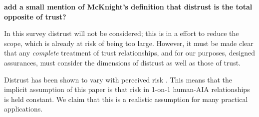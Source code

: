         \textbf{add a small mention of McKnight's definition that distrust is the total opposite of trust?}

        In this survey distrust will not be considered; this is in a effort to reduce the scope, which is already at risk of being too large. However, it must be made clear that any \emph{complete} treatment of trust relationships, and for our purposes, designed assurances, must consider the dimensions of distrust as well as those of trust. 
        
        Distrust has been shown to vary with perceived risk \cite{McKnight2004-vv}. This means that the implicit assumption of this paper is that risk in 1-on-1 human-AIA relationships is held constant. We claim that this is a realistic assumption for many practical applications.
